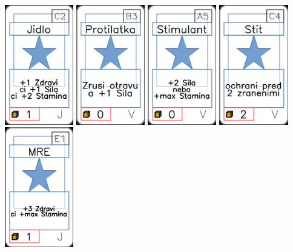 \documentclass[a4paper]{article}
\begin{document}
	\includegraphics[width=3.0cm]{img-1_11}
	\includegraphics[width=3.0cm]{img-1_67}
	\includegraphics[width=3.0cm]{img-1_64}
	\includegraphics[width=3.0cm]{img-1_73}
	\includegraphics[width=3.0cm]{img-1_20}
\end{document}
